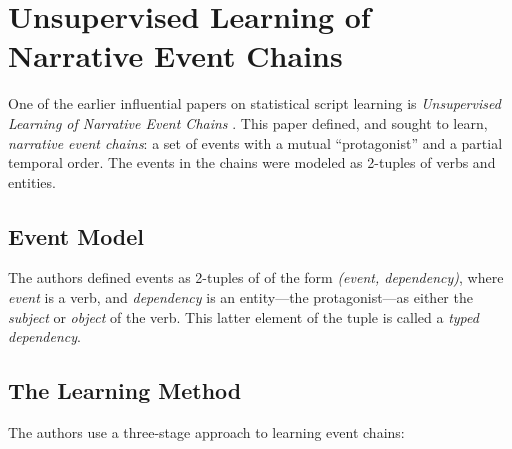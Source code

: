 \section{Unsupervised Learning of Narrative Event Chains}

One of the earlier influential papers on statistical script learning is \textit{Unsupervised Learning of Narrative Event Chains} \citep{chambers2008unsupervised}. This paper defined, and sought to learn, \textit{narrative event chains}: a set of events with a mutual ``protagonist'' and a partial temporal order. The events in the chains were modeled as 2-tuples of verbs and entities.

\subsection{Event Model}
The authors defined events as 2-tuples of of the form \textit{(event, dependency)}, where \textit{event} is a verb, and \textit{dependency} is an entity---the protagonist---as either the \textit{subject} or \textit{object} of the verb. This latter element of the tuple is called a \textit{typed dependency}.

\subsection{The Learning Method}
The authors use a three-stage approach to learning event chains:

